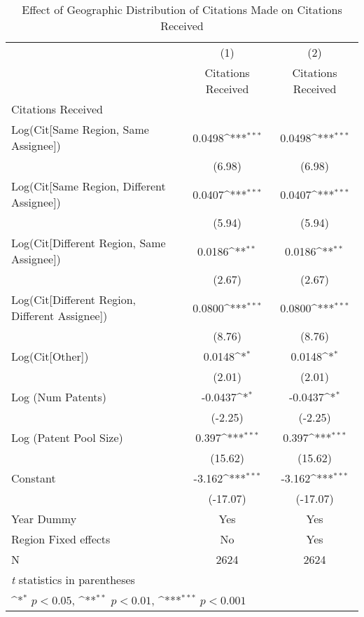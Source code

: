 {
\def\sym#1{\ifmmode^{#1}\else\(^{#1}\)\fi}
\begin{longtable}{l*{2}{c}}
\caption{Effect of Geographic Distribution of Citations Made on Citations Received \label{eflowsreg}}\\
\hline\hline\endfirsthead\hline\endhead\hline\endfoot\endlastfoot
                    &\multicolumn{1}{c}{(1)}&\multicolumn{1}{c}{(2)}\\
                    &\multicolumn{1}{c}{Citations Received}&\multicolumn{1}{c}{Citations Received}\\
\hline
Citations Received  &                     &                     \\
Log(Cit[Same Region, Same Assignee])&      0.0498\sym{***}&      0.0498\sym{***}\\
                    &      (6.98)         &      (6.98)         \\
[1em]
Log(Cit[Same Region, Different Assignee])&      0.0407\sym{***}&      0.0407\sym{***}\\
                    &      (5.94)         &      (5.94)         \\
[1em]
Log(Cit[Different Region, Same Assignee])&      0.0186\sym{**} &      0.0186\sym{**} \\
                    &      (2.67)         &      (2.67)         \\
[1em]
Log(Cit[Different Region, Different Assignee])&      0.0800\sym{***}&      0.0800\sym{***}\\
                    &      (8.76)         &      (8.76)         \\
[1em]
Log(Cit[Other])     &      0.0148\sym{*}  &      0.0148\sym{*}  \\
                    &      (2.01)         &      (2.01)         \\
[1em]
Log (Num Patents)   &     -0.0437\sym{*}  &     -0.0437\sym{*}  \\
                    &     (-2.25)         &     (-2.25)         \\
[1em]
Log (Patent Pool Size)&       0.397\sym{***}&       0.397\sym{***}\\
                    &     (15.62)         &     (15.62)         \\
[1em]
Constant            &      -3.162\sym{***}&      -3.162\sym{***}\\
                    &    (-17.07)         &    (-17.07)         \\
[1em]
Year Dummy          &         Yes         &         Yes         \\
\hline
Region Fixed effects&          No         &         Yes         \\
N                   &        2624         &        2624         \\
\hline\hline
\multicolumn{3}{l}{\footnotesize \textit{t} statistics in parentheses}\\
\multicolumn{3}{l}{\footnotesize \sym{*} \(p<0.05\), \sym{**} \(p<0.01\), \sym{***} \(p<0.001\)}\\
\end{longtable}
}
